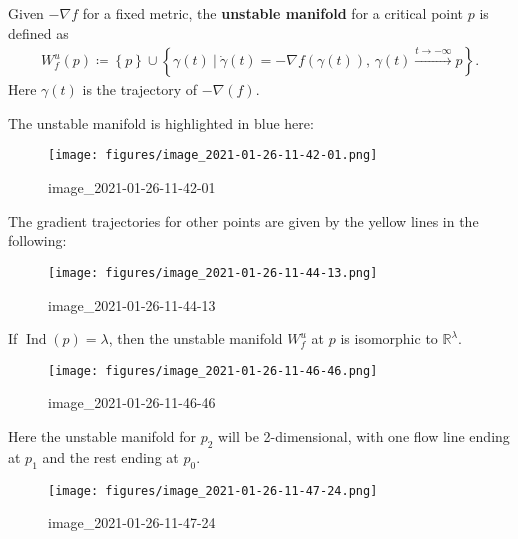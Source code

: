 \begin{definition}

Given \(- \nabla f\) for a fixed metric, the \textbf{unstable manifold}
for a critical point \(p\) is defined as
\begin{align*}
W_f^u(p) \coloneqq\left\{{p}\right\} \cup\left\{{ \gamma(t) {~\mathrel{\Big|}~}\dot \gamma(t) = - \nabla f( \gamma(t) ),\, \gamma(t) \overset{t\to -\infty}\to p }\right\}
.\end{align*}
Here \(\gamma(t)\) is the trajectory of \(-\nabla(f)\).

\end{definition}

\begin{example}[?]

The unstable manifold is highlighted in blue here:

\begin{figure}
\centering
\texttt{[image: figures/image\_2021-01-26-11-42-01.png]}
\caption{image\_2021-01-26-11-42-01}
\end{figure}

The gradient trajectories for other points are given by the yellow lines
in the following:

\begin{figure}
\centering
\texttt{[image: figures/image\_2021-01-26-11-44-13.png]}
\caption{image\_2021-01-26-11-44-13}
\end{figure}

\end{example}

\begin{lemma}[?]

If \(\mathop{\mathrm{Ind}}(p) = \lambda\), then the unstable manifold
\(W_f^u\) at \(p\) is isomorphic to \({\mathbb{R}}^ \lambda\).

\end{lemma}

\begin{example}[?]

\begin{figure}
\centering
\texttt{[image: figures/image\_2021-01-26-11-46-46.png]}
\caption{image\_2021-01-26-11-46-46}
\end{figure}

Here the unstable manifold for \(p_2\) will be 2-dimensional, with one
flow line ending at \(p_1\) and the rest ending at \(p_0\).

\begin{figure}
\centering
\texttt{[image: figures/image\_2021-01-26-11-47-24.png]}
\caption{image\_2021-01-26-11-47-24}
\end{figure}

\end{example}

